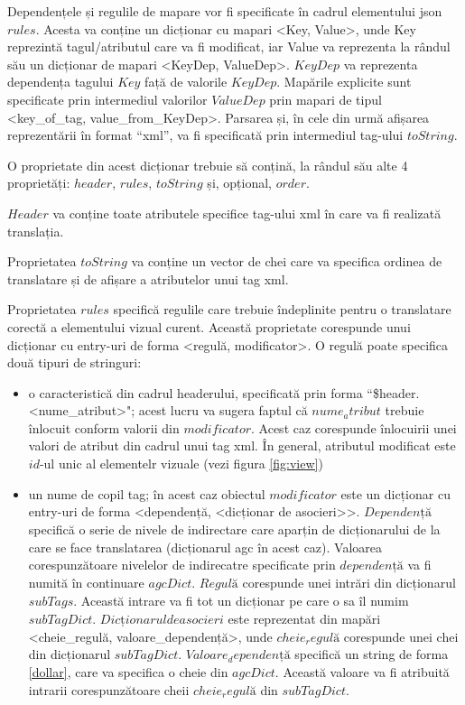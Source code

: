Dependențele și regulile de mapare vor fi specificate în cadrul elementului json $rules$. Acesta va conține un dicționar cu mapari <Key, Value>, unde Key reprezintă tagul/atributul care va fi modificat, iar Value va reprezenta la rândul său un dicționar de mapari <KeyDep, ValueDep>.  $KeyDep$ va reprezenta dependența tagului $Key$ față de valorile $KeyDep$. Mapările explicite sunt specificate prin intermediul valorilor $ValueDep$ prin mapari de tipul <key_of_tag, value_from_KeyDep>. 
Parsarea și, în cele din urmă afișarea reprezentării în format “xml”, va fi specificată prin intermediul tag-ului $toString$. 

O proprietate din acest dicționar trebuie să conțină, la rândul său alte 4 proprietăți: $header$, $rules$, $toString$ și, opțional, $order$. 

$Header$ va conține toate atributele specifice tag-ului xml în care va fi realizată translația. 

Proprietatea $toString$ va conține un vector de chei care va specifica ordinea de translatare și de afișare a atributelor unui tag xml. 

Proprietatea $rules$ specifică regulile care trebuie îndeplinite pentru o translatare corectă a elementului vizual curent. Această proprietate corespunde unui dicționar cu entry-uri de forma <regulă, modificator>.
O regulă poate specifica două tipuri de stringuri:

\begin{itemize}  
\item o caracteristică din cadrul headerului, specificată prin forma ``\$header.<nume_atribut>"; acest lucru va sugera faptul că $nume_atribut$ trebuie înlocuit conform valorii  din $modificator$. Acest caz corespunde înlocuirii unei valori de atribut din cadrul unui tag xml. În general, atributul modificat este $id$-ul unic al elementelr vizuale (vezi figura \ref{fig:view})
\item un nume de copil tag; în acest caz obiectul $modificator$ este un dicționar cu entry-uri de forma <dependență, <dicționar de asocieri>>. $Dependență$ specifică o serie de nivele de indirectare care aparțin de dicționarului de la care se face translatarea (dicționarul agc în acest caz). Valoarea corespunzătoare nivelelor de indirecatre specificate prin $dependență$ va fi numită în continuare $agcDict$. $Regulă$ corespunde unei intrări din dicționarul $subTags$. Această intrare va fi tot un dicționar pe care o sa îl numim $subTagDict$. $Dicționarul de asocieri$ este reprezentat din mapări <cheie_regulă, valoare_dependență>, unde $cheie_regulă$ corespunde unei chei din dicționarul $subTagDict$. $Valoare_dependență$ specifică un string de forma \ref{dollar}, care va specifica o cheie din $agcDict$. Această valoare va fi atribuită intrarii corespunzătoare cheii $cheie_regulă$ din $subTagDict$. 
\end{itemize}
 
